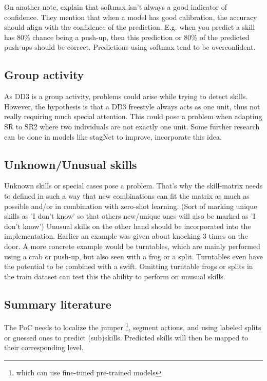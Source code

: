 On another note, \textcite{Guo_2017} explain that softmax isn't always a good indicator of confidence. They mention that when a model has good calibration, the accuracy should align with the confidence of the prediction. E.g. when you predict a skill has 80\% chance being a push-up, then this prediction or 80\% of the predicted push-ups should be correct. Predictions using softmax tend to be overconfident.

\subsection{Group activity}

As DD3 is a group activity, problems could arise while trying to detect skills. However, the hypothesis is that a DD3 freestyle always acts as one unit, thus not really requiring much special attention. This could pose a problem when adapting SR to SR2 where two individuals are not exactly one unit. Some further research can be done in models like stagNet \autocite{Qi_2020} to improve, incorporate this idea.

\subsection{Unknown/Unusual skills}
\label{subsec:literature-unknown-unusual-skills}

Unknown skills or special cases pose a problem. That’s why the skill-matrix needs to defined
in such a way that new combinations can fit the matrix as much as possible and/or in combination with zero-shot learning. (Sort of marking unique skills as ’I don’t know’ so that others new/unique ones will also be marked as ’I don’t know’) Unusual skills on the other hand should be incorporated into the implementation.
Earlier an example was given about knocking 3 times on the door. A more concrete example would be turntables, which are mainly performed using a crab or push-up, but also seen with a frog or a split.
Turntables even have the potential to be combined with a swift. Omitting turntable frogs or splits in the train dataset can test this the ability to perform on unusual skills.

\subsection{Summary literature}
\label{subsec:summary literature}

The PoC needs to localize the jumper \footnote{which can use fine-tuned pre-trained models}, segment actions, and using labeled splits or guessed ones to predict (sub)skills.
Predicted skills will then be mapped to their corresponding level.

